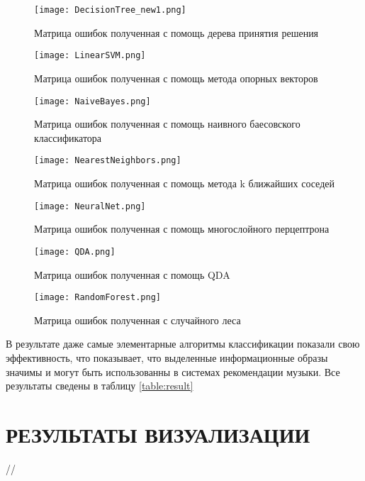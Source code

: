 \begin{figure}[h]
\centering
  \texttt{[image: DecisionTree\_new1.png]}
  \caption{Матрица ошибок полученная с помощь дерева принятия решения}
  \label{fig:results:DecisionTree1}
\end{figure}




\begin{figure}[h]
\centering
  \texttt{[image: LinearSVM.png]}
  \caption{Матрица ошибок полученная с помощь метода опорных векторов}
  \label{fig:results:LinearSVM}
\end{figure}


\begin{figure}[h]
\centering
  \texttt{[image: NaiveBayes.png]}
  \caption{Матрица ошибок полученная с помощь наивного баесовского классификатора}
  \label{fig:results:NaiveBayes}
\end{figure}

\begin{figure}[h]
\centering
  \texttt{[image: NearestNeighbors.png]}
  \caption{Матрица ошибок полученная с помощь метода k ближайших соседей}
  \label{fig:results:NearestNeighbors}
\end{figure}

\begin{figure}[h]
\centering
  \texttt{[image: NeuralNet.png]}
  \caption{Матрица ошибок полученная с помощь многослойного перцептрона}
  \label{fig:results:NeuralNet}
\end{figure}


\begin{figure}[h]
\centering
  \texttt{[image: QDA.png]}
  \caption{Матрица ошибок полученная с помощь QDA}
  \label{fig:results:QDA}
\end{figure}


\begin{figure}[h]
\centering
  \texttt{[image: RandomForest.png]}
  \caption{Матрица ошибок полученная с случайного леса}
  \label{fig:results:RandomForest}
\end{figure}


В результате даже самые элементарные алгоритмы классификации показали свою эффективность, что показывает, что выделенные информационные образы значимы и могут быть использованны в системах рекомендации музыки. Все результаты сведены в таблицу
\ref{table:result}


\section{РЕЗУЛЬТАТЫ ВИЗУАЛИЗАЦИИ}
\label{sec:genre_classification}
//




